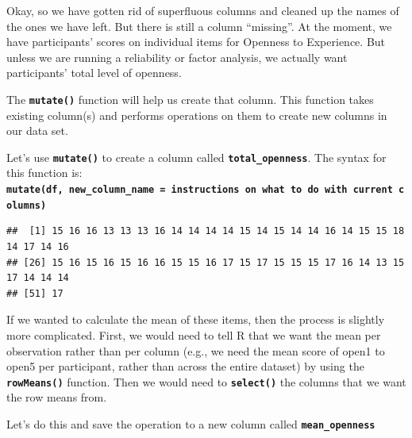 \documentclass[
]{book}
\newenvironment{Shaded}{\begin{snugshade}}{\end{snugshade}}
\newcommand{\AttributeTok}[1]{\textcolor[rgb]{0.13,0.29,0.53}{#1}}
\newcommand{\CommentTok}[1]{\textcolor[rgb]{0.56,0.35,0.01}{\textit{#1}}}
\newcommand{\FunctionTok}[1]{\textcolor[rgb]{0.13,0.29,0.53}{\textbf{#1}}}
\newcommand{\NormalTok}[1]{#1}
\newcommand{\OtherTok}[1]{\textcolor[rgb]{0.56,0.35,0.01}{#1}}
\newcommand{\SpecialCharTok}[1]{\textcolor[rgb]{0.81,0.36,0.00}{\textbf{#1}}}
\begin{document}
Okay, so we have gotten rid of superfluous columns and cleaned up the names of the ones we have left. But there is still a column ``missing''. At the moment, we have participants' scores on individual items for Openness to Experience. But unless we are running a reliability or factor analysis, we actually want participants' total level of openness.

The \textbf{\texttt{mutate()}} function will help us create that column. This function takes existing column(s) and performs operations on them to create new columns in our data set.

Let's use \textbf{\texttt{mutate()}} to create a column called \textbf{\texttt{total\_openness}}. The syntax for this function is: \textbf{\texttt{mutate(df,\ new\_column\_name\ =\ instructions\ on\ what\ to\ do\ with\ current\ columns)}}

\begin{Shaded}
\end{Shaded}

\begin{verbatim}
##  [1] 15 16 16 13 13 13 16 14 14 14 14 15 14 15 14 14 16 14 15 15 18 14 17 14 16
## [26] 15 16 15 16 15 16 16 15 15 16 17 15 17 15 15 15 17 16 14 13 15 17 14 14 14
## [51] 17
\end{verbatim}

If we wanted to calculate the mean of these items, then the process is slightly more complicated. First, we would need to tell R that we want the mean per observation rather than per column (e.g., we need the mean score of open1 to open5 per participant, rather than across the entire dataset) by using the \textbf{\texttt{rowMeans()}} function. Then we would need to \textbf{\texttt{select()}} the columns that we want the row means from.

Let's do this and save the operation to a new column called \textbf{\texttt{mean\_openness}}
\end{document}
